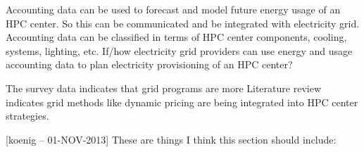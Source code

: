 \documentclass{llncs}
\begin{document}
Accounting data can be used to forecast and model future energy usage of an HPC center. So this can be communicated and be integrated with electricity grid. Accounting data can be classified in terms of HPC center components, cooling, systems, lighting, etc. If/how electricity grid providers can use energy and usage accounting data to plan electricity provisioning of an HPC center? %

The survey data indicates that grid programs are more 
Literature review indicates grid methods like dynamic pricing are being integrated into HPC center strategies.





[koenig -- 01-NOV-2013] These are things I think this section should
include:
\end{document}
